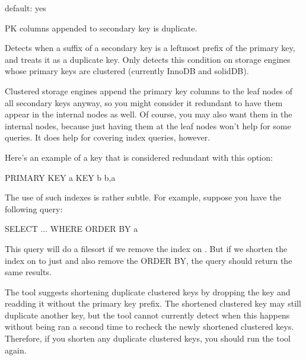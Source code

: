 \documentclass[letterpaper,10pt,english]{sphinxmanual}
\begin{document}
\begin{fulllineitems}
\label{\detokenize{mariadb-index-checker:cmdoption-mariadb-index-checker-0}}
default: yes

PK columns appended to secondary key is duplicate.

Detects when a suffix of a secondary key is a leftmost prefix of the primary
key, and treats it as a duplicate key.  Only detects this condition on storage
engines whose primary keys are clustered (currently InnoDB and solidDB).

Clustered storage engines append the primary key columns to the leaf nodes of
all secondary keys anyway, so you might consider it redundant to have them
appear in the internal nodes as well.  Of course, you may also want them in the
internal nodes, because just having them at the leaf nodes won’t help for some
queries.  It does help for covering index queries, however.

Here’s an example of a key that is considered redundant with this option:

\begin{sphinxVerbatim}[commandchars=\\\{\}]
PRIMARY KEY  a
KEY b b,a
\end{sphinxVerbatim}

The use of such indexes is rather subtle.  For example, suppose you have the
following query:

\begin{sphinxVerbatim}[commandchars=\\\{\}]
SELECT ... WHERE  ORDER BY a
\end{sphinxVerbatim}

This query will do a filesort if we remove the index on .  But if we
shorten the index on  to just  and also remove the ORDER BY, the query
should return the same results.

The tool suggests shortening duplicate clustered keys by dropping the key
and re\sphinxhyphen{}adding it without the primary key prefix.  The shortened clustered
key may still duplicate another key, but the tool cannot currently detect
when this happens without being ran a second time to re\sphinxhyphen{}check the newly
shortened clustered keys.  Therefore, if you shorten any duplicate clustered
keys, you should run the tool again.

\end{fulllineitems}
\end{document}
